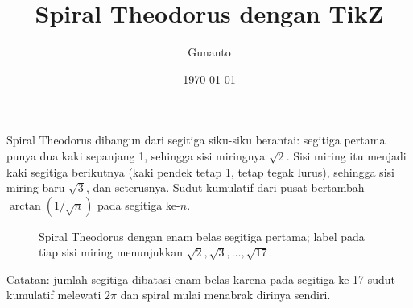 \documentclass{article}
\title{Spiral Theodorus dengan TikZ}
\author{Gunanto}
\date{\today}
\begin{document}
\maketitle

Spiral Theodorus dibangun dari segitiga siku-siku berantai: segitiga pertama
punya dua kaki sepanjang 1, sehingga sisi miringnya $\sqrt{2}$. Sisi miring itu
menjadi kaki segitiga berikutnya (kaki pendek tetap 1, tetap tegak lurus),
sehingga sisi miring baru $\sqrt{3}$, dan seterusnya. Sudut kumulatif dari
pusat bertambah $\arctan(1/\sqrt{n})$ pada segitiga ke-$n$.

\begin{figure}[H]
\centering
{}
\caption{Spiral Theodorus dengan enam belas segitiga pertama; label pada tiap
sisi miring menunjukkan $\sqrt{2}, \sqrt{3}, \dots, \sqrt{17}$.}
\end{figure}

Catatan: jumlah segitiga dibatasi enam belas karena pada segitiga ke-17 sudut
kumulatif melewati $2\pi$ dan spiral mulai menabrak dirinya sendiri.
\end{document}
